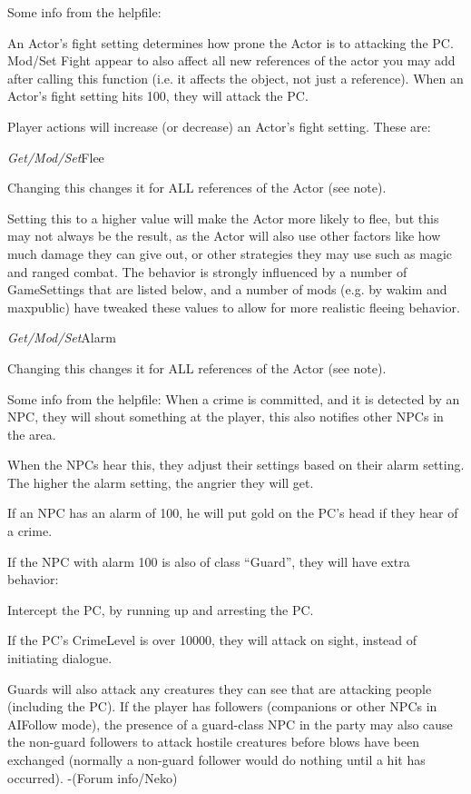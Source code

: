 \documentclass[
]{article}
\begin{document}
Some info from the helpfile:

An Actor's fight setting determines how prone the Actor is to attacking
the PC. Mod/Set Fight appear to also affect all new references of the
actor you may add after calling this function (i.e. it affects the
object, not just a reference). When an Actor's fight setting hits 100,
they will attack the PC.

Player actions will increase (or decrease) an Actor's fight setting.
These are:

\emph{Get/Mod/Set}Flee

Changing this changes it for ALL references of the Actor (see note).

Setting this to a higher value will make the Actor more likely to flee,
but this may not always be the result, as the Actor will also use other
factors like how much damage they can give out, or other strategies they
may use such as magic and ranged combat. The behavior is strongly
influenced by a number of GameSettings that are listed below, and a
number of mods (e.g. by wakim and maxpublic) have tweaked these values
to allow for more realistic fleeing behavior.

\emph{Get/Mod/Set}Alarm

Changing this changes it for ALL references of the Actor (see note).

Some info from the helpfile: When a crime is committed, and it is
detected by an NPC, they will shout something at the player, this also
notifies other NPCs in the area.

When the NPCs hear this, they adjust their settings based on their alarm
setting. The higher the alarm setting, the angrier they will get.

If an NPC has an alarm of 100, he will put gold on the PC's head if they
hear of a crime.

If the NPC with alarm 100 is also of class ``Guard'', they will have
extra behavior:

Intercept the PC, by running up and arresting the PC.

If the PC's CrimeLevel is over 10000, they will attack on sight, instead
of initiating dialogue.

Guards will also attack any creatures they can see that are attacking
people (including the PC). If the player has followers (companions or
other NPCs in AIFollow mode), the presence of a guard-class NPC in the
party may also cause the non-guard followers to attack hostile creatures
before blows have been exchanged (normally a non-guard follower would do
nothing until a hit has occurred). -(Forum info/Neko)
\end{document}
